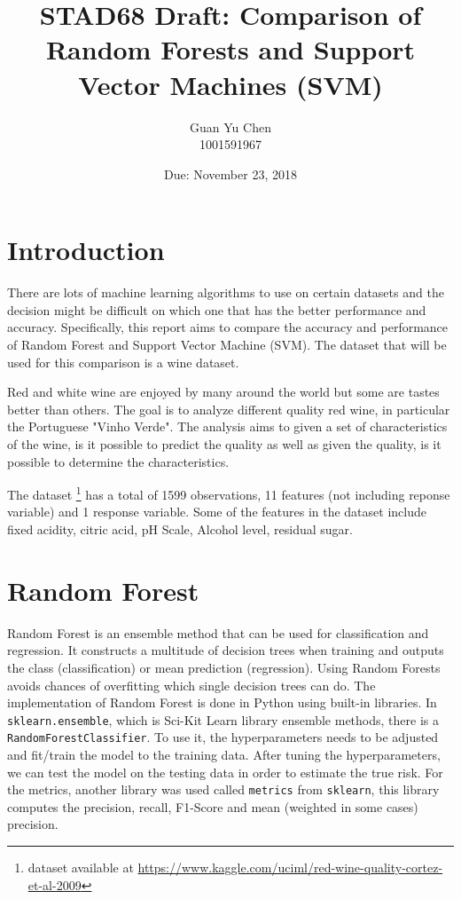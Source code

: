 \documentclass[a4paper,titlepage]{article}
\title{STAD68 Draft: Comparison of Random Forests and Support Vector Machines (SVM)}
\author{Guan Yu Chen\\ 1001591967}
\date{Due: November 23, 2018}
\begin{document}
	\maketitle
	\section{Introduction}
	There are lots of machine learning algorithms to use on certain datasets and the decision might be difficult on which one that has the better performance and accuracy. Specifically, this report aims to compare the accuracy and performance of Random Forest and Support Vector Machine (SVM). The dataset that will be used for this comparison is a wine dataset. 
	
	Red and white wine are enjoyed by many around the world but some are tastes better than others. The goal is to analyze different quality red wine, in particular the Portuguese "Vinho Verde". The analysis aims to given a set of characteristics of the wine, is it possible to predict the quality as well as given the quality, is it possible to determine the characteristics.
	
	The dataset \footnote{dataset available at \url{https://www.kaggle.com/uciml/red-wine-quality-cortez-et-al-2009}} has a total of 1599 observations, 11 features (not including reponse variable) and 1 response variable. Some of the features in the dataset include fixed acidity, citric acid, pH Scale, Alcohol level, residual sugar.
	\section{Random Forest}
	Random Forest is an ensemble method that can be used for classification and regression. It constructs a multitude of decision trees when training and outputs the class (classification) or mean prediction (regression). Using Random Forests avoids chances of overfitting which single decision trees can do. The implementation of Random Forest is done in Python using built-in libraries. In \texttt{sklearn.ensemble}, which is Sci-Kit Learn library ensemble methods, there is a \texttt{RandomForestClassifier}. To use it, the hyperparameters needs to be adjusted and fit/train the model to the training data. After tuning the hyperparameters, we can test the model on the testing data in order to estimate the true risk. For the metrics, another library was used called \texttt{metrics} from \texttt{sklearn}, this library computes the precision, recall, F1-Score and mean (weighted in some cases) precision. 
\end{document}
